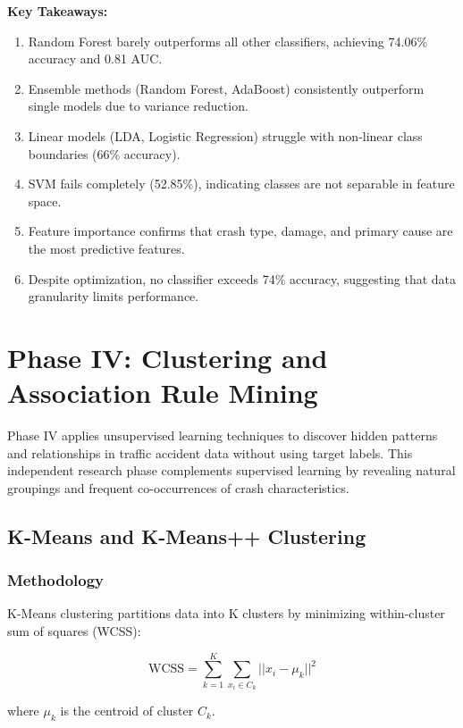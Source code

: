 \documentclass[stu,12pt,floatsintext]{apa7}
\begin{document}
\textbf{Key Takeaways:}
\begin{enumerate}
    \item Random Forest barely outperforms all other classifiers, achieving 74.06\% accuracy and 0.81 AUC.
    \item Ensemble methods (Random Forest, AdaBoost) consistently outperform single models due to variance reduction.
    \item Linear models (LDA, Logistic Regression) struggle with non-linear class boundaries (66\% accuracy).
    \item SVM fails completely (52.85\%), indicating classes are not separable in feature space.
    \item Feature importance confirms that crash type, damage, and primary cause are the most predictive features.
    \item Despite optimization, no classifier exceeds 74\% accuracy, suggesting that data granularity limits performance.
\end{enumerate}

\section{Phase IV: Clustering and Association Rule Mining}

Phase IV applies unsupervised learning techniques to discover hidden patterns and relationships in traffic accident data without using target labels. This independent research phase complements supervised learning by revealing natural groupings and frequent co-occurrences of crash characteristics.

\subsection{K-Means and K-Means++ Clustering}

\subsubsection{Methodology}

K-Means clustering partitions data into K clusters by minimizing within-cluster sum of squares (WCSS):

\begin{equation}
\mathrm{WCSS} = \sum_{k=1}^{K} \sum_{x_i \in C_k} ||x_i - \mu_k||^2
\end{equation}

where $\mu_k$ is the centroid of cluster $C_k$.
\end{document}
